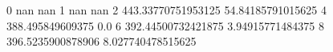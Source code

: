 0 nan nan
1 nan nan
2 443.33770751953125 54.84185791015625
4 388.495849609375 0.0
6 392.44500732421875 3.94915771484375
8 396.5235900878906 8.027740478515625
